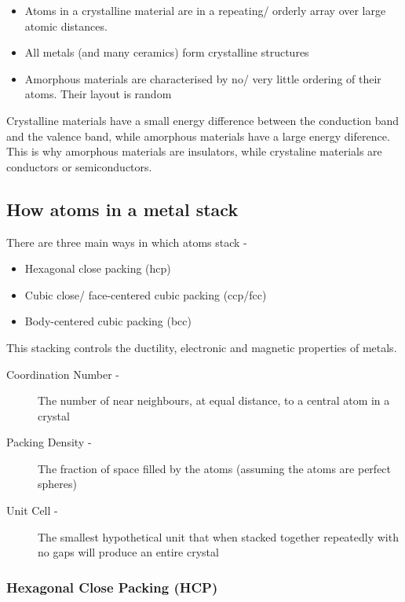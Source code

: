 \documentclass[a4paper, 12pt]{article}
\begin{document}
			\begin{itemize}
				\item Atoms in a crystalline material are in a repeating/ orderly array over large atomic distances.
				\item All metals (and many ceramics) form crystalline structures
				\item Amorphous materials are characterised by no/ very little ordering of their atoms. Their layout is random
			\end{itemize}
			
			Crystalline materials have a small energy difference between the conduction band and the valence band, while amorphous materials have a large energy diference. This is why amorphous materials are insulators, while crystaline materials are conductors or semiconductors.
			
			\subsection*{How atoms in a metal stack}
				There are three main ways in which atoms stack -
				\begin{itemize}
					\item Hexagonal close packing (hcp)
					\item Cubic close/ face-centered cubic packing (ccp/fcc)
					\item Body-centered cubic packing (bcc)
				\end{itemize}
				
				This stacking controls the ductility, electronic and magnetic properties of metals.
				
				\begin{description}
					\item[Coordination Number - ] The number of near neighbours, at equal distance, to a central atom in a crystal				
					\item[Packing Density - ] The fraction of space filled by the atoms (assuming the atoms are perfect spheres)
					\item[Unit Cell - ] The smallest hypothetical unit that when stacked together repeatedly with no gaps will produce an entire crystal
				\end{description}
				
				\subsubsection*{Hexagonal Close Packing (HCP)}
					
\end{document}

